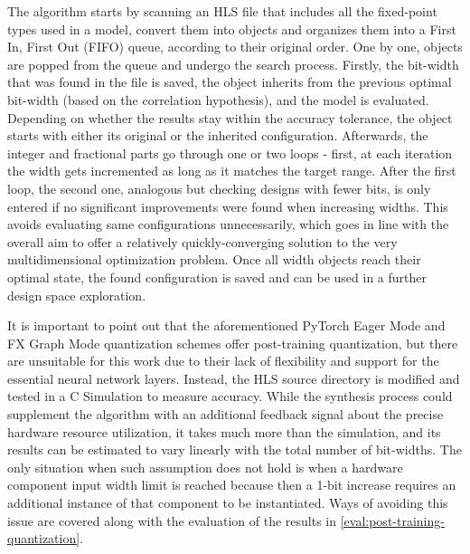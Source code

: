 The algorithm starts by scanning an HLS file that includes all the fixed-point types used in a model, convert them into objects and organizes them into a First In, First Out (FIFO) queue, according to their original order. One by one, objects are popped from the queue and undergo the search process. Firstly, the bit-width that was found in the file is saved, the object inherits from the previous optimal bit-width (based on the correlation hypothesis), and the model is evaluated. Depending on whether the results stay within the accuracy tolerance, the object starts with either its original or the inherited configuration. Afterwards, the integer and fractional parts go through one or two loops - first, at each iteration the width gets incremented as long as it matches the target range. After the first loop, the second one, analogous but checking designs with fewer bits, is only entered if no significant improvements were found when increasing widths. This avoids evaluating same configurations unnecessarily, which goes in line with the overall aim to offer a relatively quickly-converging solution to the very multidimensional optimization problem. Once all width objects reach their optimal state, the found configuration is saved and can be used in a further design space exploration.

It is important to point out that the aforementioned PyTorch Eager Mode and FX Graph Mode quantization schemes offer post-training quantization, but there are unsuitable for this work due to their lack of flexibility and support for the essential neural network layers. Instead, the HLS source directory is modified and tested in a C Simulation to measure accuracy. While the synthesis process could supplement the algorithm with an additional feedback signal about the precise hardware resource utilization, it takes much more than the simulation, and its results can be estimated to vary linearly with the total number of bit-widths. The only situation when such assumption does not hold is when a hardware component input width limit is reached because then a 1-bit increase requires an additional instance of that component to be instantiated. Ways of avoiding this issue are covered along with the evaluation of the results in \cref{eval:post-training-quantization}.

